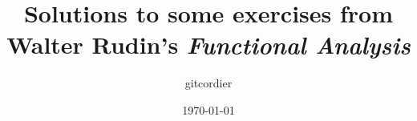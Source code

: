 \documentclass[a4paper,12pt,titlepage,openany, leqno]{book}
\def\ROOT{./}
\def\TITLE{
  Solutions to some exercises from Walter Rudin's \textit{Functional Analysis}
}
\def\AUTHOR{gitcordier}
\begin{document}
%    
\title{\TITLE}
\author{\AUTHOR}
\date{\today}
\maketitle

\renewcommand{\labelenumi}{$(\textit{\alph{enumi}}\,)$}
%
\frontmatter
\tableofcontents




\mainmatter
\renewcommand{\thechapter}{\arabic{chapter}}
\renewcommand{\thesection}{\arabic{section}}
\renewcommand{\thesubsection}{\arabic{subsection}}

%

{}
\end{document}
